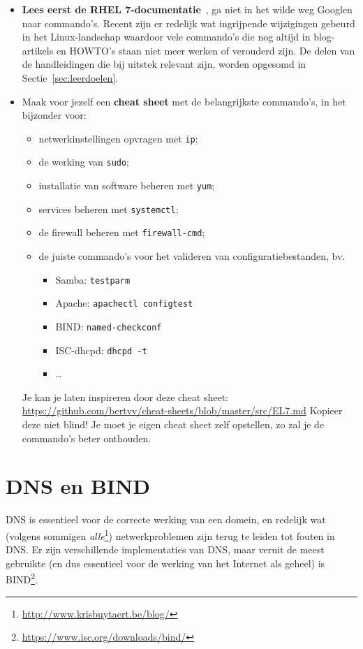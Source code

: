 \begin{itemize}
  \item \textbf{Lees eerst de RHEL 7-documentatie}~\autocite{SvistunovEtAl2016,JahodaEtAl2016,JahodaEtAl2016a}, ga niet in het wilde weg Googlen naar commando's. Recent zijn er redelijk wat ingrijpende wijzigingen gebeurd in het Linux-landschap waardoor vele commando's die nog altijd in blog-artikels en HOWTO's staan niet meer werken of verouderd zijn. De delen van de handleidingen die bij uitstek relevant zijn, worden opgesomd in Sectie~\ref{sec:leerdoelen}.
  \item Maak voor jezelf een \textbf{cheat sheet} met de belangrijkste commando's, in het bijzonder voor:
    \begin{itemize}
      \item netwerkinstellingen opvragen met \texttt{ip};
      \item de werking van \texttt{sudo};
      \item installatie van software beheren met \texttt{yum};
      \item services beheren met \texttt{systemctl};
      \item de firewall beheren met \texttt{firewall-cmd};
      \item de juiste commando's voor het valideren van configuratiebestanden, bv.
      \begin{itemize}
        \item Samba: \texttt{testparm}
        \item Apache: \texttt{apachectl configtest}
        \item BIND: \texttt{named-checkconf}
        \item ISC-dhcpd: \texttt{dhcpd -t}
        \item \ldots
      \end{itemize}
    \end{itemize}

    Je kan je laten inspireren door deze cheat sheet: \url{https://github.com/bertvv/cheat-sheets/blob/master/src/EL7.md} Kopieer deze niet blind! Je moet je eigen cheat sheet zelf opstellen, zo zal je de commando's beter onthouden.
\end{itemize}

\section{DNS en BIND}
\label{sec:dns-en-bind}

DNS is essentieel voor de correcte werking van een domein, en redelijk wat (volgens sommigen \emph{alle}\footnote{\url{http://www.krisbuytaert.be/blog/}}) netwerkproblemen zijn terug te leiden tot fouten in DNS. Er zijn verschillende implementaties van DNS, maar veruit de meest gebruikte (en dus essentieel voor de werking van het Internet als geheel) is BIND\footnote{\url{https://www.isc.org/downloads/bind/}}.

